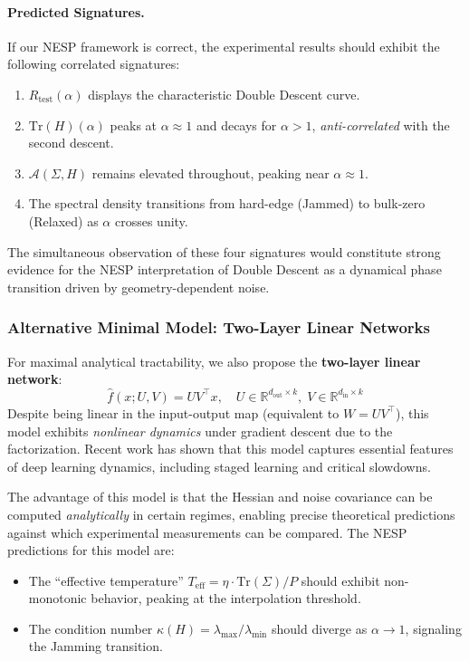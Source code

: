 \paragraph{Predicted Signatures.} If our NESP framework is correct, the experimental results should exhibit the following correlated signatures:
\begin{enumerate}[topsep=1pt,itemsep=1pt]
    \item $R_{\text{test}}(\alpha)$ displays the characteristic Double Descent curve.
    \item $\mathrm{Tr}(H)(\alpha)$ peaks at $\alpha \approx 1$ and decays for $\alpha > 1$, \textit{anti-correlated} with the second descent.
    \item $\mathcal{A}(\Sigma, H)$ remains elevated throughout, peaking near $\alpha \approx 1$.
    \item The spectral density transitions from hard-edge (Jammed) to bulk-zero (Relaxed) as $\alpha$ crosses unity.
\end{enumerate}

The simultaneous observation of these four signatures would constitute strong evidence for the NESP interpretation of Double Descent as a dynamical phase transition driven by geometry-dependent noise.

\subsubsection{Alternative Minimal Model: Two-Layer Linear Networks}

For maximal analytical tractability, we also propose the \textbf{two-layer linear network}:
\begin{equation}
    \hat{f}(x; U, V) = U V^\top x, \quad U \in \mathbb{R}^{d_{\text{out}} \times k}, \; V \in \mathbb{R}^{d_{\text{in}} \times k}
\end{equation}
Despite being linear in the input-output map (equivalent to $W = UV^\top$), this model exhibits \textit{nonlinear dynamics} under gradient descent due to the factorization. Recent work \cite{advani2017highdimensionaldynamicsgeneralizationerror,saxe2014exact} has shown that this model captures essential features of deep learning dynamics, including staged learning and critical slowdowns.

The advantage of this model is that the Hessian and noise covariance can be computed \textit{analytically} in certain regimes, enabling precise theoretical predictions against which experimental measurements can be compared. The NESP predictions for this model are:
\begin{itemize}[topsep=1pt,itemsep=1pt]
    \item The ``effective temperature'' $T_{\text{eff}} = \eta \cdot \mathrm{Tr}(\Sigma)/P$ should exhibit non-monotonic behavior, peaking at the interpolation threshold.
    \item The condition number $\kappa(H) = \lambda_{\max}/\lambda_{\min}$ should diverge as $\alpha \to 1$, signaling the Jamming transition.
\end{itemize}

